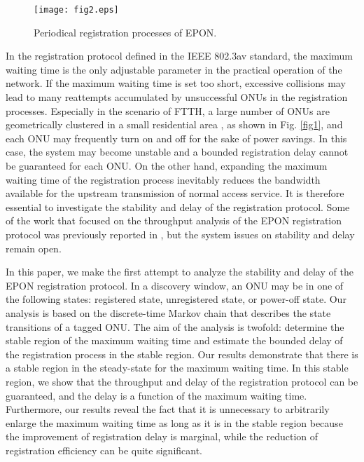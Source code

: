 \documentclass[journal]{IEEEtran}
\begin{document}
\begin{figure*}[t]
\centering
\texttt{[image: fig2.eps]}
\caption{Periodical registration processes of EPON.}\label{fig2}
\end{figure*}

In the registration protocol defined in the IEEE 802.3av standard, the maximum waiting time \cite{11Bhatia} is the only adjustable parameter in the practical operation of the network. If the maximum waiting time is set too short, excessive collisions may lead to many reattempts accumulated by unsuccessful ONUs in the registration processes. Especially in the scenario of FTTH, a large number of ONUs are geometrically clustered in a small residential area \cite{16Vaughn}, as shown in Fig. \ref{fig1}, and each ONU may frequently turn on and off for the sake of power savings. In this case, the system may become unstable and a bounded registration delay cannot be guaranteed for each ONU. On the other hand, expanding the maximum waiting time of the registration process inevitably reduces the bandwidth available for the upstream transmission of normal access service. It is therefore essential to investigate the stability and delay of the registration protocol. Some of the work that focused on the throughput analysis of the EPON registration protocol was previously reported in \cite{9cui2012throughput,10Bjelica,11Bhatia,12Hajduczenia,13Bhatia}, but the system issues on stability and delay remain open.

In this paper, we make the first attempt to analyze the stability and delay of the EPON registration protocol. In a discovery window, an ONU may be in one of the following states: registered state, unregistered state, or power-off state. Our analysis is based on the discrete-time Markov chain that describes the state transitions of a tagged ONU. The aim of the analysis is twofold: determine the stable region of the maximum waiting time and estimate the bounded delay of the registration process in the stable region. Our results demonstrate that there is a stable region in the steady-state for the maximum waiting time. In this stable region, we show that the throughput and delay of the registration protocol can be guaranteed, and the delay is a function of the maximum waiting time. Furthermore, our results reveal the fact that it is unnecessary to arbitrarily enlarge the maximum waiting time as long as it is in the stable region because the improvement of registration delay is marginal, while the reduction of registration efficiency can be quite significant.
\end{document}
